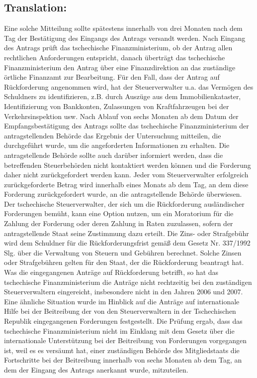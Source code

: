 \documentclass[10pt]{article}
\begin{document}
\pagebreak

\subsection*{Translation:}

Eine solche Mitteilung sollte spätestens innerhalb von drei Monaten nach dem Tag der Bestätigung des Eingangs des Antrags versandt werden.
Nach Eingang des Antrags prüft das tschechische Finanzministerium, ob der Antrag allen rechtlichen Anforderungen entspricht, danach überträgt das tschechische Finanzministerium den Antrag über eine Finanzdirektion an das zuständige örtliche Finanzamt zur Bearbeitung.
Für den Fall, dass der Antrag auf Rückforderung angenommen wird, hat der Steuerverwalter u.a. das Vermögen des Schuldners zu identifizieren, z.B. durch Auszüge aus dem Immobilienkataster, Identifizierung von Bankkonten, Zulassungen von Kraftfahrzeugen bei der Verkehrsinspektion usw.
Nach Ablauf von sechs Monaten ab dem Datum der Empfangsbestätigung des Antrags sollte das tschechische Finanzministerium der antragstellenden Behörde das Ergebnis der Untersuchung mitteilen, die durchgeführt wurde, um die angeforderten Informationen zu erhalten.
Die antragstellende Behörde sollte auch darüber informiert werden, dass die betreffenden Steuerbehörden nicht kontaktiert werden können und die Forderung daher nicht zurückgefordert werden kann.
Jeder vom Steuerverwalter erfolgreich zurückgeforderte Betrag wird innerhalb eines Monats ab dem Tag, an dem diese Forderung zurückgefordert wurde, an die antragstellende Behörde überwiesen.
Der tschechische Steuerverwalter, der sich um die Rückforderung ausländischer Forderungen bemüht, kann eine Option nutzen, um ein Moratorium für die Zahlung der Forderung oder deren Zahlung in Raten zuzulassen, sofern der antragstellende Staat seine Zustimmung dazu erteilt.
Die Zins- oder Strafgebühr wird dem Schuldner für die Rückforderungsfrist gemäß dem Gesetz Nr. 337/1992 Slg. über die Verwaltung von Steuern und Gebühren berechnet.
Solche Zinsen oder Strafgebühren gelten für den Staat, der die Rückforderung beantragt hat.
Was die eingegangenen Anträge auf Rückforderung betrifft, so hat das tschechische Finanzministerium die Anträge nicht rechtzeitig bei den zuständigen Steuerverwaltern eingereicht, insbesondere nicht in den Jahren 2006 und 2007.
Eine ähnliche Situation wurde im Hinblick auf die Anträge auf internationale Hilfe bei der Beitreibung der von den Steuerverwaltern in der Tschechischen Republik eingegangenen Forderungen festgestellt.
Die Prüfung ergab, dass das tschechische Finanzministerium nicht im Einklang mit dem Gesetz über die internationale Unterstützung bei der Beitreibung von Forderungen vorgegangen ist, weil es es versäumt hat, einer zuständigen Behörde des Mitgliedstaats die Fortschritte bei der Beitreibung innerhalb von sechs Monaten ab dem Tag, an dem der Eingang des Antrags anerkannt wurde, mitzuteilen.
\end{document}
